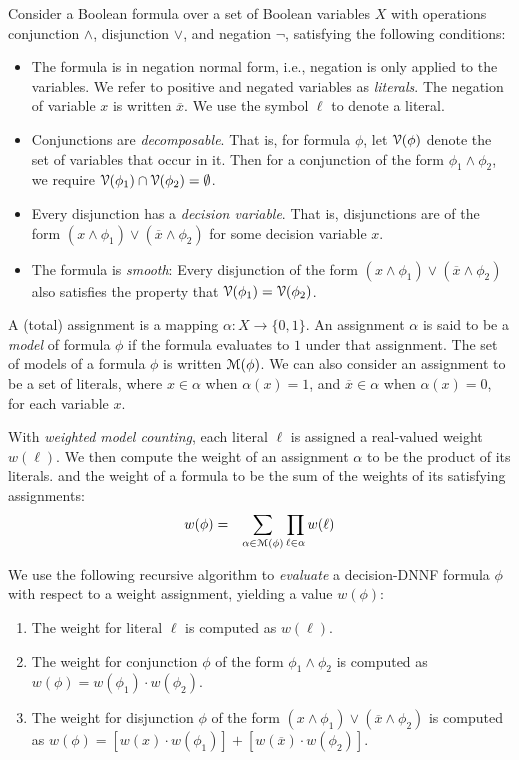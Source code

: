 \documentclass[letterpaper,USenglish,cleveref, autoref, thm-restate]{lipics-v2021}
\newcommand{\obar}[1]{\overline{#1}}
\newcommand{\lit}{\ell}
\newcommand{\varset}{X}
\newcommand{\dependencyset}{{\cal V}}
\newcommand{\assign}{\alpha}
\newcommand{\modelset}{{\cal M}}
\begin{document}
Consider a Boolean formula over a set of Boolean variables $\varset$
with operations conjunction $\land$, disjunction $\lor$, and negation
$\neg$, satisfying the following conditions:
\begin{itemize}
\item The formula is in negation normal form, i.e., negation is only
  applied to the variables.  We refer to positive and negated
  variables as \emph{literals}.  The negation of variable $x$ is
  written $\obar{x}$. We use the symbol $\lit$ to denote a literal.
\item Conjunctions are \emph{decomposable}.  That is, for formula $\phi$, let $\dependencyset(\phi)$ denote the set of variables that occur in it.  Then for a conjunction of the form
  $\phi_1 \land \phi_2$, we require $\dependencyset(\phi_1) \cap \dependencyset(\phi_2) = \emptyset$.
\item Every disjunction has a \emph{decision variable}.  That is, disjunctions are of the form $(x \land \phi_1) \lor (\obar{x} \land \phi_2)$ for some decision variable $x$. 
\item The formula is \emph{smooth}: Every disjunction of the form $(x \land \phi_1) \lor (\obar{x} \land \phi_2)$ 
also satisfies the property that $\dependencyset(\phi_1) = \dependencyset(\phi_2)$.
\end{itemize}

A (total) assignment is a mapping $\assign \colon \varset \rightarrow \{0, 1\}$.  An assignment $\assign$ is said to be a \emph{model} of formula
$\phi$ if the formula evaluates to $1$ under that assignment.  The
set of models of a formula $\phi$ is written $\modelset(\phi)$.  We
can also consider an assignment to be a set of literals, where
$x \in \assign$ when $\assign(x) = 1$, and  $\obar{x} \in \assign$ when $\assign(x) = 0$, for each variable $x$.

With \emph{weighted model counting}, each literal $\lit$ is assigned a
real-valued weight $w(\lit)$.  We then compute the weight of an
assignment $\assign$ to be the product of its literals. and the weight
of a formula to be the sum of the weights of its satisfying assignments:
\begin{eqnarray}
  w(\phi) & = & \sum_{\assign \in \modelset(\phi)} \prod_{\lit \in \assign} w(\lit) \label{eqn:model:count}
\end{eqnarray}

We use the following recursive algorithm to \emph{evaluate} a decision-DNNF formula $\phi$ with respect to a weight assignment, yielding a value $w(\phi)$:
\begin{enumerate}
\item The weight for literal $\lit$ is computed as $w(\lit)$.
\item The weight for  conjunction $\phi$ of the form $\phi_1 \land \phi_2$ is computed as $w(\phi) = w(\phi_1) \cdot w(\phi_2)$.
\item The weight for disjunction $\phi$ of the form 
  $(x \land \phi_1) \lor (\obar{x} \land \phi_2)$ is computed as
  $w(\phi) = [w(x) \cdot w(\phi_1)] + [w(\obar{x}) \cdot w(\phi_2)]$.
\end{enumerate}
\end{document}

